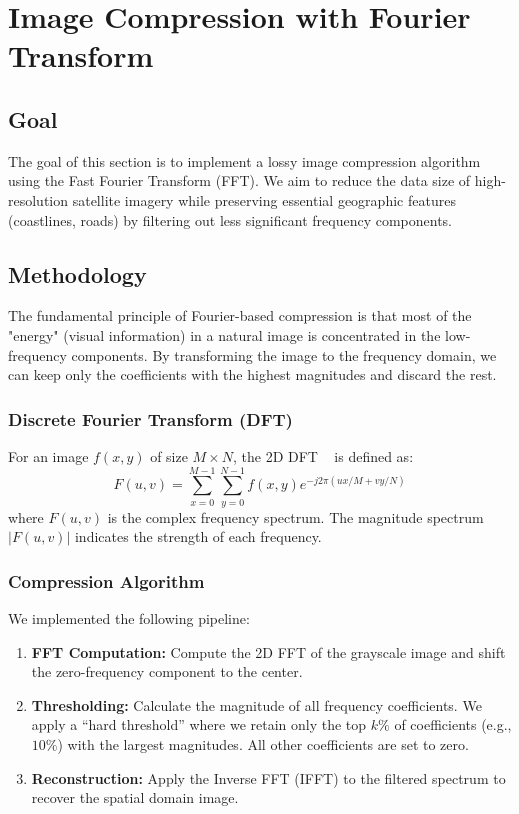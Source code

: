 \documentclass[12pt]{article}
\begin{document}
\newpage
\section{Image Compression with Fourier Transform}

\subsection{Goal}
The goal of this section is to implement a lossy image compression algorithm using the Fast Fourier Transform (FFT). We aim to reduce the data size of high-resolution satellite imagery while preserving essential geographic features (coastlines, roads) by filtering out less significant frequency components.

\subsection{Methodology}
The fundamental principle of Fourier-based compression is that most of the "energy" (visual information) in a natural image is concentrated in the low-frequency components. By transforming the image to the frequency domain, we can keep only the coefficients with the highest magnitudes and discard the rest.

\subsubsection{Discrete Fourier Transform (DFT)}
For an image $f(x,y)$ of size $M \times N$, the 2D DFT ~\cite{park20152d} is defined as:
\begin{equation}
    F(u,v) = \sum_{x=0}^{M-1} \sum_{y=0}^{N-1} f(x,y) e^{-j 2\pi (ux/M + vy/N)}
\end{equation}
where $F(u,v)$ is the complex frequency spectrum. The magnitude spectrum $|F(u,v)|$ indicates the strength of each frequency.

\subsubsection{Compression Algorithm}
We implemented the following pipeline:
\begin{enumerate}
    \item \textbf{FFT Computation:} Compute the 2D FFT of the grayscale image and shift the zero-frequency component to the center.
    \item \textbf{Thresholding:} Calculate the magnitude of all frequency coefficients. We apply a ``hard threshold'' where we retain only the top $k\%$ of coefficients (e.g., $10\%$) with the largest magnitudes. All other coefficients are set to zero.
    \item \textbf{Reconstruction:} Apply the Inverse FFT (IFFT) to the filtered spectrum to recover the spatial domain image.
\end{enumerate}
\end{document}
